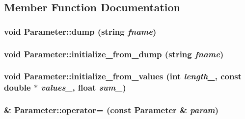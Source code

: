 \subsection{Member Function Documentation}
\hypertarget{struct_parameter_a9196971fa12b28330c9baef92671ed70}{
\subsubsection[{dump}]{\setlength{\rightskip}{0pt plus 5cm}void Parameter::dump (string {\em fname})}}
\label{struct_parameter_a9196971fa12b28330c9baef92671ed70}
\hypertarget{struct_parameter_a7af368f9019c0d7591b5cd783222b051}{
\subsubsection[{initialize\_\-from\_\-dump}]{\setlength{\rightskip}{0pt plus 5cm}void Parameter::initialize\_\-from\_\-dump (string {\em fname})}}
\label{struct_parameter_a7af368f9019c0d7591b5cd783222b051}
\hypertarget{struct_parameter_a3f4dc4990a4301f103d606060ab0a1b1}{
\subsubsection[{initialize\_\-from\_\-values}]{\setlength{\rightskip}{0pt plus 5cm}void Parameter::initialize\_\-from\_\-values (int {\em length\_\-}, \/  const double $\ast$ {\em values\_\-}, \/  float {\em sum\_\-})}}
\label{struct_parameter_a3f4dc4990a4301f103d606060ab0a1b1}
\hypertarget{struct_parameter_adb1df6ea6fccec000753226f28957f3a}{
\subsubsection[{operator=}]{ \& Parameter::operator= (const {\bf Parameter} \& {\em param})}}
\label{struct_parameter_adb1df6ea6fccec000753226f28957f3a}


